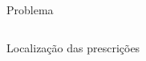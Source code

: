 \documentclass[professionalfont]{beamer}
\begin{document}
\begin{frame}{Problema \theproblem}
\begin{columns}
\begin{column}{0.5\textwidth}
            {\small \hspace{0.5cm}Localização das prescrições}
        \end{column}
    \end{columns}

    
\end{frame}

\newcommand{\FrameProblemName}{Problema \theproblem}

\end{document}
